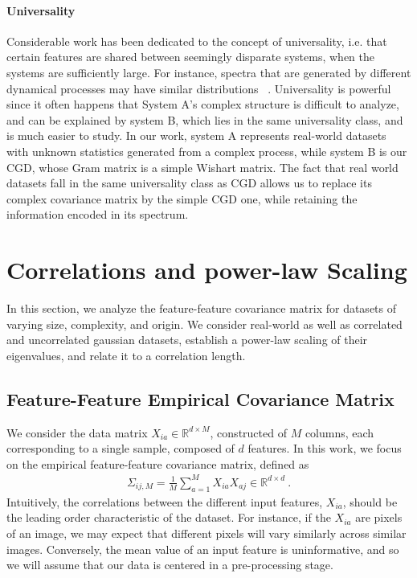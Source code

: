 \documentclass{article}
\begin{document}
\paragraph{Universality}
Considerable work has been dedicated to the concept of universality, i.e. that certain features are shared between seemingly disparate systems, when the systems are sufficiently large. For instance, spectra that are generated by different dynamical processes may have similar distributions ~\citep{Bao_2015,baik2004phase,hu2022universality,bai2010spectral}. 
Universality is powerful since it often happens that System A's complex structure is difficult to analyze, and can be explained by system B, which lies in the same universality class, and is much easier to study. In our work, system A represents real-world datasets with unknown statistics generated from a complex process, while system B is our CGD, whose Gram matrix is a simple Wishart matrix. The fact that real world datasets fall in the same universality class as CGD allows us to replace its complex covariance matrix by the simple CGD one, while retaining the information encoded in its spectrum. 




\section{Correlations and power-law Scaling}

In this section, we analyze the feature-feature covariance matrix for datasets of varying size, complexity, and origin. We consider real-world as well as correlated and uncorrelated gaussian datasets, establish a power-law scaling of their eigenvalues, and relate it to a correlation length.

\subsection{Feature-Feature Empirical Covariance Matrix}
\label{sec:covariance matrix}
We consider the data matrix $X_{i a} \in \mathbb{R}^{d\times M} $, constructed of $M$ columns, each corresponding to a single sample, composed of $d$ features. In this work, we focus on the empirical feature-feature covariance matrix, defined as
\begin{align}
\label{eq:empirical_covariance}
    \Sigma_{ij,M}=
    \frac{1}{M}\sum_{a = 1}^{M}
    X_{i a}
    X_{a j}
     \in \mathbb{R}^{d\times d} \ .
\end{align}
Intuitively, the correlations between the different input features, $X_{ia}$, should be the leading order characteristic of the dataset. For instance, if the $X_{ia}$ are pixels of an image, we may expect that different
pixels will vary similarly across similar images. Conversely, the mean value of an input feature is uninformative, and so we will assume that our data is centered in a pre-processing stage. 
\end{document}
